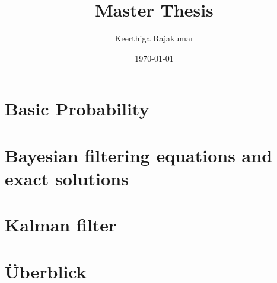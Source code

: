 \documentclass{article}
\title{Master Thesis}
\author{Keerthiga Rajakumar}
\date{\today}
\theoremstyle{plain} %
\theoremstyle{definition} %
\theoremstyle{remark} %
\begin{document}

\maketitle
\newpage

\tableofcontents %

\newpage

\setcounter{page}{1} %

\section{Basic Probability}


\newpage
\section{Bayesian filtering equations and exact solutions}


\newpage
\section{Kalman filter}


\newpage
\section{Überblick}

\end{document}
